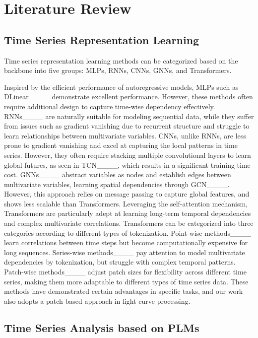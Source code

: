 \section{Literature Review}
\subsection{Time Series Representation Learning}

Time series representation learning methods can be categorized based on the backbone into five groups: MLPs, RNNs, CNNs, GNNs, and Transformers. 

Inspired by the efficient performance of autoregressive models, 
MLPs 
such as DLinear____ demonstrate excellent performance. However, these methods often require additional design to capture time-wise dependency effectively. 
RNNs____ are naturally suitable for modeling sequential data, while they suffer from issues such as gradient vanishing due to recurrent structure and struggle to learn relationships between multivariate variables. 
CNNs, unlike RNNs, are less prone to gradient vanishing and excel at capturing the local patterns in time series. However, they often require stacking multiple convolutional layers to learn global futures, as seen in TCN____, which results in a significant training time cost. 
GNNs____ abstract variables as nodes and establish edges between multivariate variables, learning spatial dependencies through GCN____. However, this approach relies on message passing to capture global features, and shows less scalable than Transformers. 
Leveraging the self-attention mechanism, Transformers are particularly adept at learning long-term temporal dependencies and complex multivariate correlations. 
Transformers can be categorized into three categories according to different types of tokenization. 
Point-wise methods____ learn correlations between time steps but become computationally expensive for long sequences.
Series-wise methods____ pay attention to model multivariate dependencies by tokenization, but struggle with complex temporal patterns.
Patch-wise methods____ adjust patch sizes for flexibility across different time series, making them more adaptable to different types of time series data.
These methods have demonstrated certain advantages in specific tasks, and our work also adopts a patch-based approach in light curve processing.

\subsection{Time Series Analysis based on PLMs} 

